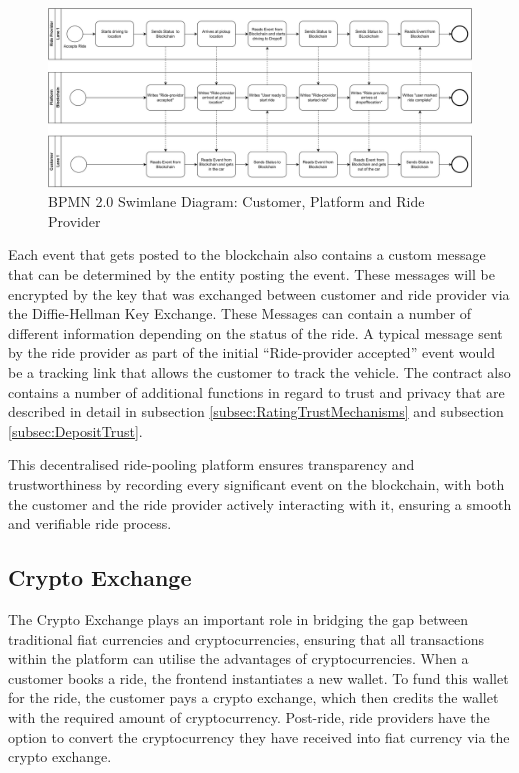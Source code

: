 \begin{figure}[h]
    \centering
    \includegraphics[width=\linewidth]{data/1.svg}
    \caption{BPMN 2.0 Swimlane Diagram: Customer, Platform and Ride Provider}
    \label{fig:SwimLaneCustomer}
\end{figure}


Each event that gets posted to the blockchain also contains a custom message that can be determined by the entity posting the event. These messages will be encrypted by the key that was exchanged between customer and ride provider via the Diffie-Hellman Key Exchange. These Messages can contain a number of different information depending on the status of the ride. A typical message sent by the ride provider as part of the initial ``Ride-provider accepted'' event would be a tracking link that allows the customer to track the vehicle.  The contract also contains a number of additional functions in regard to trust and privacy that are described in detail in subsection \ref{subsec:RatingTrustMechanisms} and subsection \ref{subsec:DepositTrust}.

This decentralised ride-pooling platform ensures transparency and trustworthiness by recording every significant event on the blockchain, with both the customer and the ride provider actively interacting with it, ensuring a smooth and verifiable ride process.


\subsection{Crypto Exchange}\label{subsec:CryptoExchange}

The Crypto Exchange plays an important role in bridging the gap between traditional fiat currencies and cryptocurrencies, ensuring that all transactions within the platform can utilise the advantages of cryptocurrencies. When a customer books a ride, the frontend instantiates a new wallet. To fund this wallet for the ride, the customer pays a crypto exchange, which then credits the wallet with the required amount of cryptocurrency. Post-ride, ride providers have the option to convert the cryptocurrency they have received into fiat currency via the crypto exchange.

